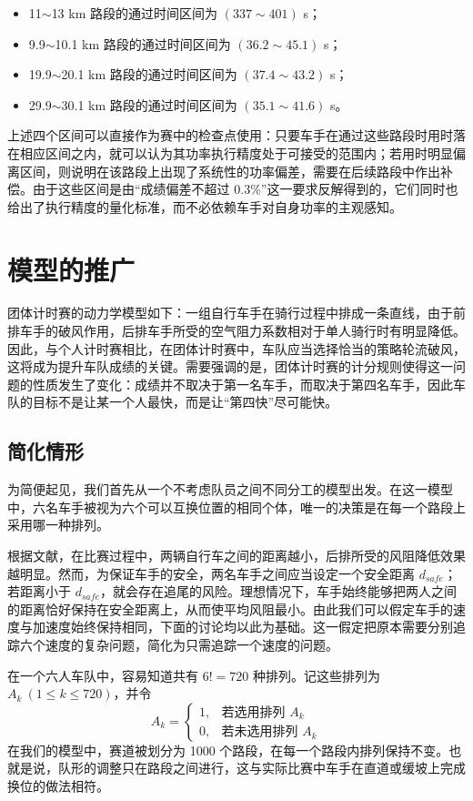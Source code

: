 \documentclass[11pt,a4paper]{ctexart}
\begin{document}
\begin{itemize}
\item 11$\sim$13 km 路段的通过时间区间为 $(337\sim401)$ s；
\item 9.9$\sim$10.1 km 路段的通过时间区间为 $(36.2\sim45.1)$ s；
\item 19.9$\sim$20.1 km 路段的通过时间区间为 $(37.4\sim43.2)$ s；
\item 29.9$\sim$30.1 km 路段的通过时间区间为 $(35.1\sim41.6)$ s。
\end{itemize}

上述四个区间可以直接作为赛中的检查点使用：只要车手在通过这些路段时用时落在相应区间之内，就可以认为其功率执行精度处于可接受的范围内；若用时明显偏离区间，则说明在该路段上出现了系统性的功率偏差，需要在后续路段中作出补偿。由于这些区间是由“成绩偏差不超过 0.3\%”这一要求反解得到的，它们同时也给出了执行精度的量化标准，而不必依赖车手对自身功率的主观感知。

\section{模型的推广}

团体计时赛的动力学模型如下：一组自行车手在骑行过程中排成一条直线，由于前排车手的破风作用，后排车手所受的空气阻力系数相对于单人骑行时有明显降低。因此，与个人计时赛相比，在团体计时赛中，车队应当选择恰当的策略轮流破风，这将成为提升车队成绩的关键。需要强调的是，团体计时赛的计分规则使得这一问题的性质发生了变化：成绩并不取决于第一名车手，而取决于第四名车手，因此车队的目标不是让某一个人最快，而是让“第四快”尽可能快。

\subsection{简化情形}

为简便起见，我们首先从一个不考虑队员之间不同分工的模型出发。在这一模型中，六名车手被视为六个可以互换位置的相同个体，唯一的决策是在每一个路段上采用哪一种排列。

根据文献，在比赛过程中，两辆自行车之间的距离越小，后排所受的风阻降低效果越明显。然而，为保证车手的安全，两名车手之间应当设定一个安全距离 $d_{safe}$；若距离小于 $d_{safe}$，就会存在追尾的风险。理想情况下，车手始终能够把两人之间的距离恰好保持在安全距离上，从而使平均风阻最小。由此我们可以假定车手的速度与加速度始终保持相同，下面的讨论均以此为基础。这一假定把原本需要分别追踪六个速度的复杂问题，简化为只需追踪一个速度的问题。

在一个六人车队中，容易知道共有 $6!=720$ 种排列。记这些排列为 $A_k\ (1\le k\le 720)$，并令
\[
A_k=
\begin{cases}
1, & \text{若选用排列 }A_k\\
0, & \text{若未选用排列 }A_k
\end{cases}
\]
在我们的模型中，赛道被划分为 1000 个路段，在每一个路段内排列保持不变。也就是说，队形的调整只在路段之间进行，这与实际比赛中车手在直道或缓坡上完成换位的做法相符。
\end{document}
